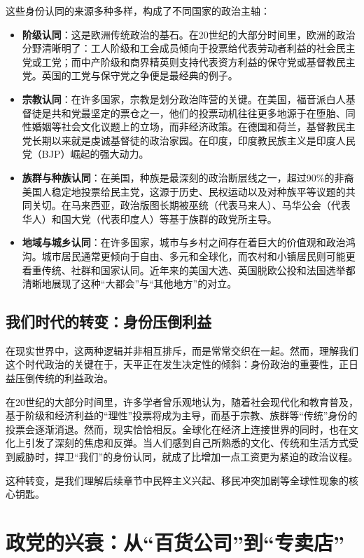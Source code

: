 \documentclass[a5paper, 11pt, openany]{ctexbook}
\begin{document}
这些身份认同的来源多种多样，构成了不同国家的政治主轴：
\begin{itemize}
    \item \textbf{阶级认同}：这是欧洲传统政治的基石。在20世纪的大部分时间里，欧洲的政治分野清晰明了：工人阶级和工会成员倾向于投票给代表劳动者利益的社会民主党或工党；而中产阶级和商界精英则支持代表资方利益的保守党或基督教民主党。英国的工党与保守党之争便是最经典的例子。
    \item \textbf{宗教认同}：在许多国家，宗教是划分政治阵营的关键。在美国，福音派白人基督徒是共和党最坚定的票仓之一，他们的投票动机往往更多地源于在堕胎、同性婚姻等社会文化议题上的立场，而非经济政策。在德国和荷兰，基督教民主党长期以来就是虔诚基督徒的政治家园。在印度，印度教民族主义是印度人民党（BJP）崛起的强大动力。
    \item \textbf{族群与种族认同}：在美国，种族是最深刻的政治断层线之一，超过90\%的非裔美国人稳定地投票给民主党，这源于历史、民权运动以及对种族平等议题的共同关切。在马来西亚，政治版图长期被巫统（代表马来人）、马华公会（代表华人）和国大党（代表印度人）等基于族群的政党所主导。
    \item \textbf{地域与城乡认同}：在许多国家，城市与乡村之间存在着巨大的价值观和政治鸿沟。城市居民通常更倾向于自由、多元和全球化，而农村和小镇居民则可能更看重传统、社群和国家认同。近年来的美国大选、英国脱欧公投和法国选举都清晰地展现了这种“大都会”与“其他地方”的对立。
\end{itemize}

\subsection{我们时代的转变：身份压倒利益}

在现实世界中，这两种逻辑并非相互排斥，而是常常交织在一起。然而，理解我们这个时代政治的关键在于，天平正在发生决定性的倾斜：身份政治的重要性，正日益压倒传统的利益政治。

在20世纪的大部分时间里，许多学者曾乐观地认为，随着社会现代化和教育普及，基于阶级和经济利益的“理性”投票将成为主导，而基于宗教、族群等“传统”身份的投票会逐渐消退。然而，现实恰恰相反。全球化在经济上连接世界的同时，也在文化上引发了深刻的焦虑和反弹。当人们感到自己所熟悉的文化、传统和生活方式受到威胁时，捍卫“我们”的身份认同，就成了比增加一点工资更为紧迫的政治议程。

这种转变，是我们理解后续章节中民粹主义兴起、移民冲突加剧等全球性现象的核心钥匙。

\section{政党的兴衰：从“百货公司”到“专卖店”}
\end{document}
